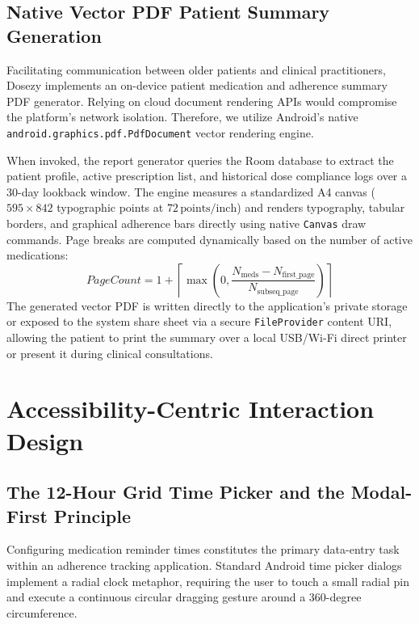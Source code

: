 \documentclass[11pt,a4paper]{article}
\begin{document}
\subsection{Native Vector PDF Patient Summary Generation}

Facilitating communication between older patients and clinical practitioners, Dosezy implements an on-device patient medication and adherence summary PDF generator. Relying on cloud document rendering APIs would compromise the platform's network isolation. Therefore, we utilize Android's native \texttt{android.graphics.pdf.PdfDocument} vector rendering engine.

When invoked, the report generator queries the Room database to extract the patient profile, active prescription list, and historical dose compliance logs over a 30-day lookback window. The engine measures a standardized A4 canvas ($595 \times 842$ typographic points at $72\,\text{points/inch}$) and renders typography, tabular borders, and graphical adherence bars directly using native \texttt{Canvas} draw commands. Page breaks are computed dynamically based on the number of active medications:
\begin{equation}
    PageCount = 1 + \left\lceil \max\left(0, \frac{N_{\text{meds}} - N_{\text{first\_page}}}{N_{\text{subseq\_page}}}\right) \right\rceil
\end{equation}
The generated vector PDF is written directly to the application's private storage or exposed to the system share sheet via a secure \texttt{FileProvider} content URI, allowing the patient to print the summary over a local USB/Wi-Fi direct printer or present it during clinical consultations.

\section{Accessibility-Centric Interaction Design}
\label{sec:interaction_design}

\subsection{The 12-Hour Grid Time Picker and the Modal-First Principle}

Configuring medication reminder times constitutes the primary data-entry task within an adherence tracking application. Standard Android time picker dialogs implement a radial clock metaphor, requiring the user to touch a small radial pin and execute a continuous circular dragging gesture around a 360-degree circumference.
\end{document}
